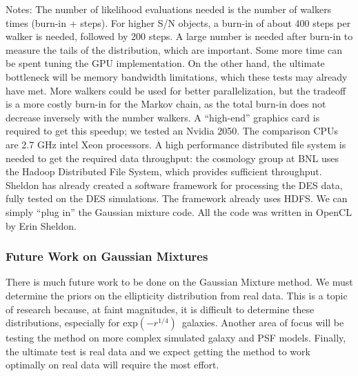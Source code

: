 \documentclass[12pt]{article}
\newcommand{\devprof}{exp$(-r^{1/4})$}
\begin{document}
{\it
    
Notes:  The number of likelihood evaluations needed is the number of walkers
times (burn-in + steps).  For higher S/N objects, a burn-in of about 400 steps
per walker is needed, followed by 200 steps.  A large number is needed after
burn-in to measure the tails of the distribution, which are important. Some
more time can be spent tuning the GPU implementation. On the other hand, the
ultimate bottleneck will be memory bandwidth limitations, which these tests may
already have met.   More walkers could be used for better parallelization, but
the tradeoff is a more costly burn-in for the Markov chain, as the total
burn-in does not decrease inversely with the number walkers.  A ``high-end''
graphics card is required to get this speedup; we tested an Nvidia 2050. The
comparison CPUs are 2.7 GHz intel Xeon processors.  A high performance
distributed file system is needed to get the required data throughput: the
cosmology group at BNL uses the Hadoop Distributed File System, which provides
sufficient throughput.  Sheldon has already created a software framework for
processing the DES data, fully tested on the DES simulations.  The framework
already uses HDFS.  We can simply ``plug in'' the Gaussian mixture code.  All
the code was written in OpenCL by Erin Sheldon.

}

\subsubsection{Future Work on Gaussian Mixtures}

There is much future work to be done on the Gaussian Mixture method.  We must
determine the priors on the ellipticity distribution from real data.  This is a
topic of research because, at faint magnitudes, it is difficult to determine
these distributions, especially for \devprof\ galaxies\cite{Miller12}.  Another
area of focus will be testing the method on more complex simulated galaxy and
PSF models.  Finally, the ultimate test is real data and we expect getting the
method to work optimally on real data will require the most effort.
\end{document}
